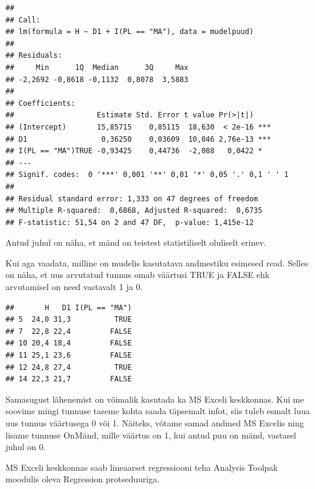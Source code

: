 \documentclass[
]{book}
\newenvironment{Shaded}{\begin{snugshade}}{\end{snugshade}}
\newcommand{\FunctionTok}[1]{\textcolor[rgb]{0.13,0.29,0.53}{\textbf{#1}}}
\newcommand{\NormalTok}[1]{#1}
\newcommand{\SpecialCharTok}[1]{\textcolor[rgb]{0.81,0.36,0.00}{\textbf{#1}}}
\renewenvironment{Shaded} {\begin{snugshade}\footnotesize} {\end{snugshade}}
\begin{document}
\begin{verbatim}
## 
## Call:
## lm(formula = H ~ D1 + I(PL == "MA"), data = mudelpuud)
## 
## Residuals:
##     Min      1Q  Median      3Q     Max 
## -2,2692 -0,8618 -0,1132  0,8078  3,5883 
## 
## Coefficients:
##                   Estimate Std. Error t value Pr(>|t|)    
## (Intercept)       15,85715    0,85115  18,630  < 2e-16 ***
## D1                 0,36250    0,03609  10,046 2,76e-13 ***
## I(PL == "MA")TRUE -0,93425    0,44736  -2,088   0,0422 *  
## ---
## Signif. codes:  0 '***' 0,001 '**' 0,01 '*' 0,05 '.' 0,1 ' ' 1
## 
## Residual standard error: 1,333 on 47 degrees of freedom
## Multiple R-squared:  0,6868, Adjusted R-squared:  0,6735 
## F-statistic: 51,54 on 2 and 47 DF,  p-value: 1,415e-12
\end{verbatim}

Antud juhul on näha, et mänd on teistest statistiliselt oluliselt erinev.

Kui aga vaadata, milline on mudelis kasutatava andmestiku esimesed read. Selles on näha, et uus arvutatud tunnus omab väärtusi TRUE ja FALSE ehk arvutamisel on need vastavalt 1 ja 0.

\begin{Shaded}
\end{Shaded}

\begin{verbatim}
##       H   D1 I(PL == "MA")
## 5  24,0 31,3          TRUE
## 7  22,8 22,4         FALSE
## 10 20,4 18,4         FALSE
## 11 25,1 23,6         FALSE
## 12 24,8 27,4          TRUE
## 14 22,3 21,7         FALSE
\end{verbatim}

Samasugust lähenemist on võimalik kasutada ka MS Exceli keskkonnas. Kui me soovime mingi tunnuse taseme kohta saada täpsemalt infot, siis tuleb esmalt luua uus tunnus väärtusega 0 või 1. Näiteks, võtame samad andmed MS Excelis ning lisame tunnuse OnMänd, mille väärtus on 1, kui antud puu on mänd, vastasel juhul on 0.

MS Exceli keskkonnas saab lineaarset regressiooni teha Analysis Toolpak moodulis oleva Regression protseduuriga.
\end{document}
